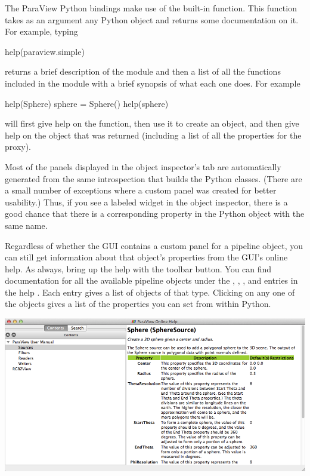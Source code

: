 The ParaView Python bindings make use of the  built-in
function.  This function takes as an argument any Python object and returns
some documentation on it.  For example, typing
\begin{python}
  help(paraview.simple)
\end{python}
returns a brief description of the module and then a list of all the
functions included in the module with a brief synopsis of what each one
does.  For example
\begin{python}
  help(Sphere)
  sphere = Sphere()
  help(sphere)
\end{python}
will first give help on the  function, then use it to create
an object, and then give help on the object that was returned (including a
list of all the properties for the proxy).

Most of the panels displayed in the object inspector's  tab
are automatically generated from the same introspection that builds the
Python classes. (There are a small number of exceptions where a custom
panel was created for better usability.) Thus, if you see a labeled widget
in the object inspector, there is a good chance that there is a
corresponding property in the Python object with the same name.

Regardless of whether the GUI contains a custom panel for a pipeline
object, you can still get information about that object's properties from
the GUI's online help.  As always, bring up the help with the
 toolbar button.  You can find documentation for all the
available pipeline objects under the , , , and  entries in the help
.  Each entry gives a list of objects of that type.  Clicking
on any one of the objects gives a list of the properties you can set from
within Python.

\begin{inlinefig}
  \includegraphics[width=\scw]{images/ObjectHelp}
\end{inlinefig}


